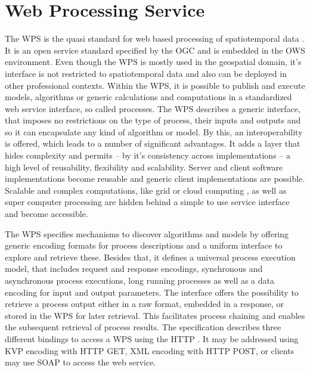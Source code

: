 \chapter{Web Processing Service}
	\label{sec:wps}
	The \ac{WPS} \citep{ogc:wps} is the quasi standard for web based processing of spatiotemporal data \citep{foerster2012live}. It is an open service standard specified by the \ac{OGC} and is embedded in the \ac{OWS} \citep{ogc:ows} environment. Even though the \ac{WPS} is mostly used in the geospatial domain, it's interface is not restricted to spatiotemporal data and also can be deployed in other professional contexts. Within the WPS, it is possible to publish and execute models, algorithms or generic calculations and computations in a standardized web service interface, so called processes. The \ac{WPS} describes a generic interface, that imposes no restrictions on the type of process, their inputs and outputs and so it can encapsulate any kind of algorithm or model. By this, an interoperability is offered, which leads to a number of significant advantages. It adds a layer that hides complexity and permits -- by it's consistency across implementations -- a high level of reusability, flexibility and scalability. Server and client software implementations become reusable and generic client implementations are possible. Scalable and complex computations, like grid \citep[e.g.][]{grid1,grid2,grid3} or cloud computing \citep[e.g.][]{cloud}, as well as super computer processing are hidden behind a simple to use service interface and become accessible.

	The \ac{WPS} specifies mechanisms to discover algorithms and models by offering generic encoding formats for process descriptions and a uniform interface to explore and retrieve these. Besides that, it defines a universal process execution model, that includes request and response encodings, synchronous and asynchronous process executions, long running processes as well as a data encoding for input and output parameters. The interface offers the possibility to retrieve a process output either in a raw format, embedded in a response, or stored in the \ac{WPS} for later retrieval. This facilitates process chaining and enables the subsequent retrieval of process results. The specification describes three different bindings to access a \ac{WPS} using the \acl{HTTP} \citep[\acs{HTTP},][]{ietf:rfc2616}. It may be addressed using \ac{KVP} encoding with HTTP GET, XML encoding with HTTP POST, or clients may use SOAP \citep{w3c:soap1} to access the web service.

